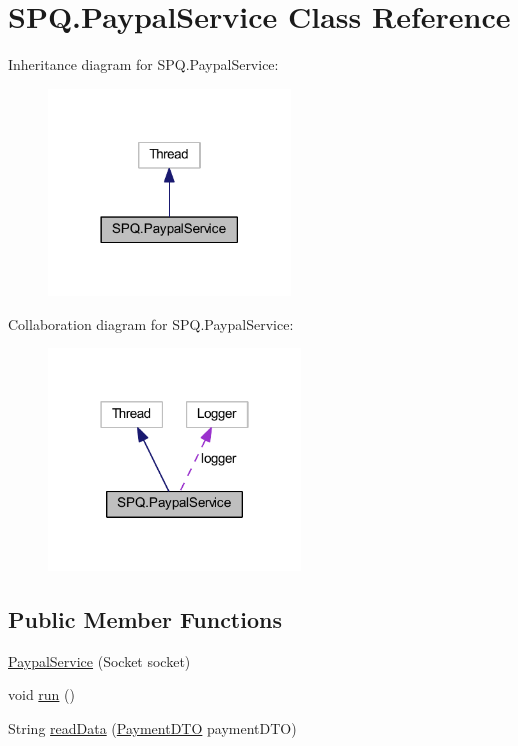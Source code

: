 \hypertarget{class_s_p_q_1_1_paypal_service}{}\section{S\+P\+Q.\+Paypal\+Service Class Reference}
\label{class_s_p_q_1_1_paypal_service}


Inheritance diagram for S\+P\+Q.\+Paypal\+Service\+:\nopagebreak
\begin{figure}[H]
\begin{center}
\leavevmode
\includegraphics[width=182pt]{class_s_p_q_1_1_paypal_service__inherit__graph}
\end{center}
\end{figure}


Collaboration diagram for S\+P\+Q.\+Paypal\+Service\+:\nopagebreak
\begin{figure}[H]
\begin{center}
\leavevmode
\includegraphics[width=190pt]{class_s_p_q_1_1_paypal_service__coll__graph}
\end{center}
\end{figure}
\subsection*{Public Member Functions}
\begin{DoxyCompactItemize}
\item 
\mbox{\hyperlink{class_s_p_q_1_1_paypal_service_a3cbaf105ed828689b48c82ec63527779}{Paypal\+Service}} (Socket socket)
\item 
void \mbox{\hyperlink{class_s_p_q_1_1_paypal_service_a05e65efee1bcfa26a215ea48b7c8696a}{run}} ()
\item 
String \mbox{\hyperlink{class_s_p_q_1_1_paypal_service_aae478af6069bf1ffa928b09f2a91328d}{read\+Data}} (\mbox{\hyperlink{class_s_p_q_1_1dto_1_1_payment_d_t_o}{Payment\+D\+TO}} payment\+D\+TO)
\end{DoxyCompactItemize}


